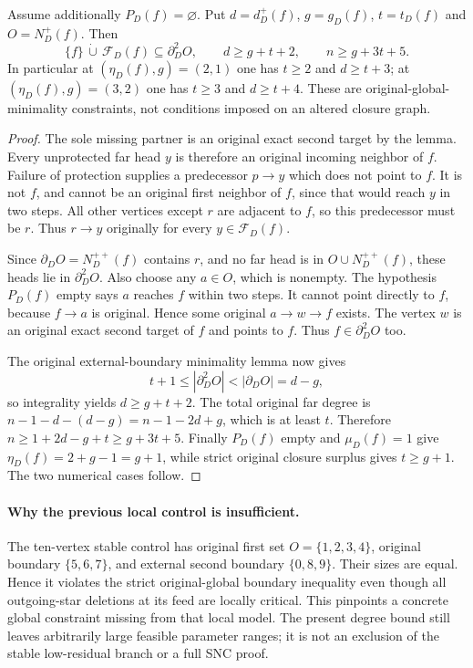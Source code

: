 \begin{proposition}
\label{prop:nearwhole-feed-third-layer-budget}
Assume additionally $P_D(f)=\varnothing$. Put
$d=d_D^+(f)$, $g=g_D(f)$, $t=t_D(f)$ and $O=N_D^+(f)$.
Then
\[
 \{f\}\,\dot\cup\,\mathcal F_D(f)\subseteq\partial_D^2O,
 \qquad d\ge g+t+2,
 \qquad n\ge g+3t+5.
\]
In particular at $(\eta_D(f),g)=(2,1)$ one has $t\ge2$ and
$d\ge t+3$; at $(\eta_D(f),g)=(3,2)$ one has $t\ge3$ and
$d\ge t+4$. These are original-global-minimality constraints, not
conditions imposed on an altered closure graph.
\end{proposition}
\begin{proof}
The sole missing partner is an original exact second target by the lemma.
Every unprotected far head $y$ is therefore an original incoming neighbor
of $f$. Failure of protection supplies a predecessor $p\to y$ which
does not point to $f$. It is not $f$, and cannot be an original first
neighbor of $f$, since that would reach $y$ in two steps. All other
vertices except $r$ are adjacent to $f$, so this predecessor must be $r$.
Thus $r\to y$ originally for every $y\in\mathcal F_D(f)$.

Since $\partial_D O=N_D^{++}(f)$ contains $r$, and no far head is
in $O\cup N_D^{++}(f)$, these heads lie in $\partial_D^2O$.
Also choose any $a\in O$, which is nonempty. The hypothesis $P_D(f)$
empty says $a$ reaches $f$ within two steps. It cannot point directly
to $f$, because $f\to a$ is original. Hence some original
$a\to w\to f$ exists. The vertex $w$ is an original exact second
target of $f$ and points to $f$. Thus $f\in\partial_D^2O$ too.

The original external-boundary minimality lemma now gives
\[
 t+1\le|\partial_D^2O|<|\partial_D O|=d-g,
\]
so integrality yields $d\ge g+t+2$. The total original far degree is
$n-1-d-(d-g)=n-1-2d+g$, which is at least $t$.
Therefore $n\ge1+2d-g+t\ge g+3t+5$.
Finally $P_D(f)$ empty and $\mu_D(f)=1$ give
$\eta_D(f)=2+g-1=g+1$, while strict original closure surplus gives
$t\ge g+1$. The two numerical cases follow.
\end{proof}

\paragraph{Why the previous local control is insufficient.}
The ten-vertex stable control has original first set
$O=\{1,2,3,4\}$, original boundary $\{5,6,7\}$, and external second
boundary $\{0,8,9\}$. Their sizes are equal. Hence it violates the
strict original-global boundary inequality even though all outgoing-star
deletions at its feed are locally critical. This pinpoints a concrete
global constraint missing from that local model. The present degree
bound still leaves arbitrarily large feasible parameter ranges; it is
not an exclusion of the stable low-residual branch or a full SNC proof.
